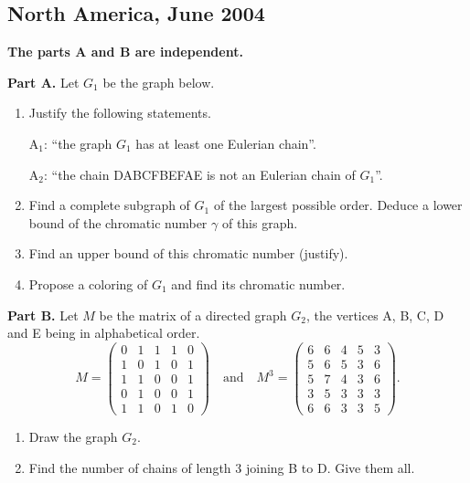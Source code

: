 \subsection{North America, June 2004}\label{anm04}
\textbf{The parts A and B are independent.}

\medskip
\textbf{Part A.} Let $G_1$ be the graph below.

\begin{center}
\end{center}

\begin{enumerate}
\item Justify the following statements.

      A$_1$: ``the graph $G_1$ has at least one Eulerian chain''.

      A$_2$: ``the chain DABCFBEFAE is not an Eulerian chain of
      $G_1$''.
\item Find a complete subgraph of $G_1$ of the largest possible order.
      Deduce a lower bound of the chromatic number $\gamma$ of this graph.
\item Find an upper bound of this chromatic number (justify).
\item Propose a coloring of $G_1$ and find its chromatic number.
\end{enumerate}

\medskip
\textbf{Part B.} Let $M$ be the matrix of a directed graph $G_2$, the
vertices A, B, C, D and E being in alphabetical order.
\[
M =
\begin{pmatrix}
0 & 1 & 1 & 1 & 0\\
1 & 0 & 1 & 0 & 1\\
1 & 1 & 0 & 0 & 1\\
0 & 1 & 0 & 0 & 1\\
1 & 1 & 0 & 1 & 0
\end{pmatrix}
\quad\text{and}\quad
M^3 =
\begin{pmatrix}
6 & 6 & 4 & 5 & 3\\
5 & 6 & 5 & 3 & 6\\
5 & 7 & 4 & 3 & 6\\
3 & 5 & 3 & 3 & 3\\
6 & 6 & 3 & 3 & 5
\end{pmatrix}.
\]
\begin{enumerate}
\item Draw the graph $G_2$.
\item Find the number of chains of length 3 joining B to D. Give them all.
\end{enumerate}

